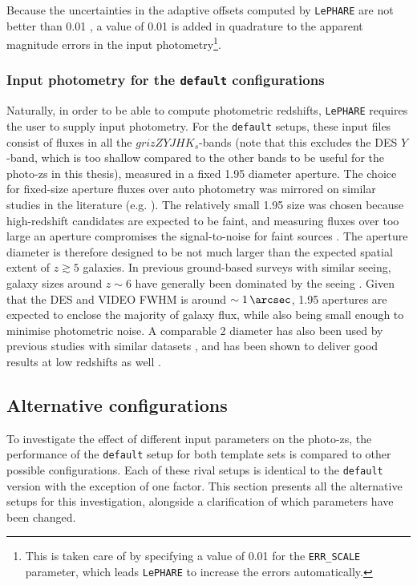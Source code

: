 Because the uncertainties in the adaptive offsets computed by \texttt{LePHARE} are not better than \SI{0.01}{\mag} \citep{2009ApJ...690.1236I}, a value of 0.01 is added in quadrature to the apparent magnitude errors in the input photometry\footnote{This is taken care of by specifying a value of \SI{0.01}{\mag} for the \texttt{ERR\_SCALE} parameter, which leads \texttt{LePHARE} to increase the errors automatically.}. 

\subsubsection{Input photometry for the \texttt{default} configurations}\label{subsubsection:input_phot_default}
Naturally, in order to be able to compute photometric redshifts, \texttt{LePHARE} requires the user to supply input photometry. For the \texttt{default} setups, these input files consist of fluxes in all the \DESVIDEO $grizZYJHK_{s}$-bands (note that this excludes the DES $Y$-band, which is too shallow compared to the other bands to be useful for the photo-zs in this thesis), measured in a fixed \SI{1.95}{\arcsec} diameter aperture. The choice for fixed-size aperture fluxes over auto photometry was mirrored on similar studies in the literature (e.g. \citealt{2009ApJ...701.1839M,2013MNRAS.428.1281J,2012MNRAS.426.2772B,2014MNRAS.440.2810B}). The relatively small \SI{1.95}{\arcsec} size was chosen because high-redshift candidates are expected to be faint, and measuring fluxes over too large an aperture compromises the signal-to-noise for faint sources \citep{2019NatAs...3..212S}. The aperture diameter is therefore designed to be not much larger than the expected spatial extent of $z\gtrsim5$ galaxies. In previous ground-based surveys with similar seeing, galaxy sizes around $z\sim6$ have generally been dominated by the seeing \citep{2013AJ....145....4W,2014MNRAS.440.2810B,2015MNRAS.452.1817B}. Given that the DES and VIDEO FWHM is around $\sim\SI{1}{\arcsec}$, \SI{1.95}{\arcsec} apertures are expected to enclose the majority of galaxy flux, while also being small enough to minimise photometric noise. A comparable \SI{2}{\arcsec} diameter has also been used by previous studies with similar datasets \citep{2013MNRAS.428.1281J,2012MNRAS.426.2772B}, and has been shown to deliver good results at low redshifts as well \citep{2009ApJ...701.1839M,2013MNRAS.428.1281J}. \par 


\subsection{Alternative configurations}\label{subsection:alternative_setups}
To investigate the effect of different input parameters on the photo-zs, the performance of the \texttt{default} setup for both template sets is compared to other possible configurations. Each of these rival setups is identical to the \texttt{default} version with the exception of one factor. This section presents all the alternative setups for this investigation, alongside a clarification of which parameters have been changed. \par

